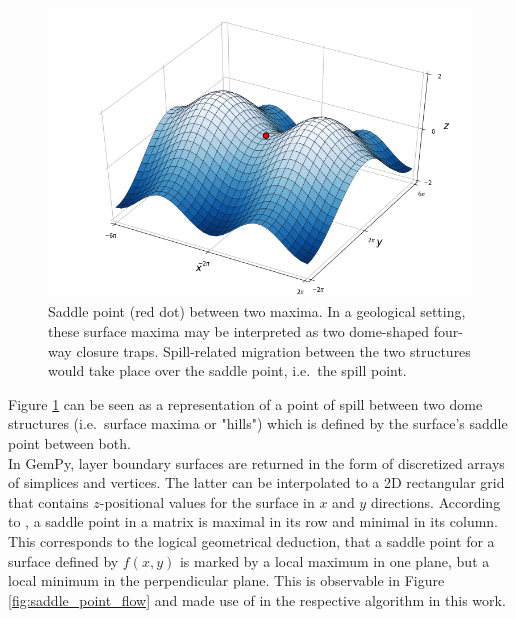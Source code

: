 			\begin{figure}[h]
				\centering
				\includegraphics[width=1\textwidth]{Figures/Saddle_Point_between_maxima.png}
				\caption{Saddle point (red dot) between two maxima. In a geological setting, these surface maxima may be interpreted as two dome-shaped four-way closure traps. Spill-related migration between the two structures would take place over the saddle point, i.e.\ the spill point.}\label{fig:saddle_point_maxima}
			\end{figure}
			Figure \ref{fig:saddle_point_maxima} can be seen as a representation of a point of spill between two dome structures (i.e.\ surface maxima or "hills") which is defined by the surface's saddle point between both.\\			
			In GemPy, layer boundary surfaces are returned in the form of discretized arrays of simplices and vertices. The latter can be interpolated to a 2D rectangular grid that contains $z$-positional values for the surface in $x$ and $y$ directions. According to \citet{verschelde2017programmingtools}, a saddle point in a matrix is maximal in its row and minimal in its column. This corresponds to the logical geometrical deduction, that a saddle point for a surface defined by $f(x,y)$ is marked by a local maximum in one plane, but a local minimum in the perpendicular plane. This is observable in Figure \ref{fig:saddle_point_flow} and made use of in the respective algorithm in this work.
